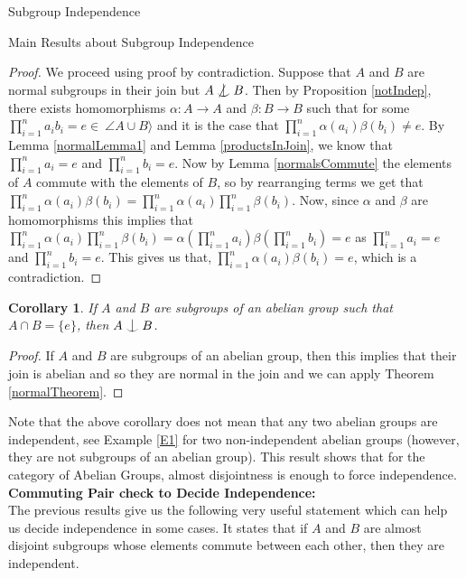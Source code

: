\documentclass{article}
\newtheorem{corollary}{Corollary}[section]
\def\indep{\mathrel{\raise0.2ex\hbox{\ooalign{\hidewidth$\vert$\hidewidth\cr\raise-0.9ex\hbox{$\smile$}}}}}
\begin{document}
\begin{section}{Subgroup Independence}
\begin{subsection}{Main Results about Subgroup Independence}
			\begin{proof} We proceed using proof by contradiction. Suppose that $A$ and $B$ are normal subgroups in their join but  $A \not\indep B$. Then by Proposition \ref{notIndep}, there exists homomorphisms $\alpha : A \rightarrow A$ and $\beta : B \rightarrow B$ such that for some $\prod_{i=1}^{n}a_ib_i = e \in \ \angle A\cup B\rangle  $ and it is the case that $\prod_{i=1}^{n}\alpha(a_i)\beta(b_i) \not = e$. By Lemma \ref{normalLemma1} and Lemma \ref{productsInJoin}, we know that $\prod_{i=1}^{n}a_i = e$ and $\prod_{i=1}^{n}b_i = e$.  Now by Lemma \ref{normalsCommute} the elements of $A$ commute with the elements of $B$, so by rearranging terms we get that $\prod_{i=1}^{n}\alpha(a_i)\beta(b_i) = \prod_{i=1}^{n}\alpha(a_i)\prod_{i=1}^{n} \beta(b_i)$. Now, since $\alpha$ and $\beta$ are homomorphisms this implies that $ \prod_{i=1}^{n}\alpha(a_i)\prod_{i=1}^{n} \beta(b_i)= \alpha (\prod_{i=1}^{n}a_i) \beta(\prod_{i=1}^{n}b_i) = e $ as  $\prod_{i=1}^{n}a_i = e$ and $\prod_{i=1}^{n}b_i = e$. This gives us that,  $\prod_{i=1}^{n}\alpha(a_i)\beta(b_i) = e$, which is a contradiction.
			\end{proof}	
			
			\begin{corollary}
				If $A$ and $B$ are subgroups of an abelian group such that $A \cap B = \{e\}$, then $A \indep B$.
			\end{corollary}
			
			\begin{proof}
				If $A$ and $B$ are subgroups of an abelian group, then this implies that their join is abelian and so they are normal in the join and we can apply  Theorem \ref{normalTheorem}.
			\end{proof}
			
			\noindent Note that the above corollary does not mean that any two abelian groups are independent, see Example \ref{E1} for two non-independent abelian groups (however, they are not subgroups of an abelian group). This result shows that for the category of Abelian Groups, almost disjointness is enough to force independence.\\
			
			
			
			
			
			\noindent \textbf{Commuting Pair check to Decide Independence:}\\
			
			The previous results give us the following very useful statement which can help us decide independence in some cases. It states that if $A$ and $B$ are almost disjoint subgroups whose elements commute between each other, then they are independent.
			

\end{subsection}
\end{section}
\end{document}
